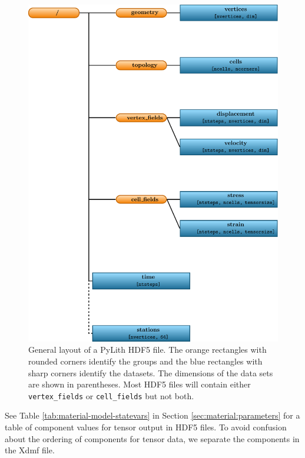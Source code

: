 \noindent \begin{center}
\begin{figure}[H]
\noindent \begin{centering}
\includegraphics{runpylith/figs/hdf5layout}
\par\end{centering}

\caption{General layout of a PyLith HDF5 file. The orange rectangles with rounded
corners identify the groups and the blue rectangles with sharp corners
identify the datasets. The dimensions of the data sets are shown in
parentheses. Most HDF5 files will contain either \texttt{vertex\_fields}
or \texttt{cell\_fields} but not both. \label{fig:hdf5:layout}}
\end{figure}

\par\end{center}

See Table \ref{tab:material-model-statevars} in Section \ref{sec:material:parameters}
for a table of component values for tensor output in HDF5 files. To
avoid confusion about the ordering of components for tensor data,
we separate the components in the Xdmf file.

